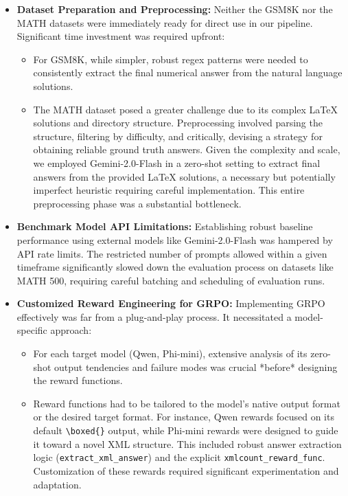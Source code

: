 \documentclass[11pt]{article}
\begin{document}
\begin{itemize}
\begin{itemize}
    \item \textbf{Dataset Preparation and Preprocessing:} Neither the GSM8K nor the MATH datasets were immediately ready for direct use in our pipeline. Significant time investment was required upfront:
        \begin{itemize}
            \item For GSM8K, while simpler, robust regex patterns were needed to consistently extract the final numerical answer from the natural language solutions.
            \item The MATH dataset posed a greater challenge due to its complex LaTeX solutions and directory structure. Preprocessing involved parsing the structure, filtering by difficulty, and critically, devising a strategy for obtaining reliable ground truth answers. Given the complexity and scale, we employed Gemini-2.0-Flash in a zero-shot setting to extract final answers from the provided LaTeX solutions, a necessary but potentially imperfect heuristic requiring careful implementation. This entire preprocessing phase was a substantial bottleneck.
        \end{itemize}

    \item \textbf{Benchmark Model API Limitations:} Establishing robust baseline performance using external models like Gemini-2.0-Flash was hampered by API rate limits. The restricted number of prompts allowed within a given timeframe significantly slowed down the evaluation process on datasets like MATH 500, requiring careful batching and scheduling of evaluation runs.

    \item \textbf{Customized Reward Engineering for GRPO:} Implementing GRPO effectively was far from a plug-and-play process. It necessitated a model-specific approach:
        \begin{itemize}
            \item For each target model (Qwen, Phi-mini), extensive analysis of its zero-shot output tendencies and failure modes was crucial *before* designing the reward functions.
            \item Reward functions had to be tailored to the model's native output format or the desired target format. For instance, Qwen rewards focused on its default \texttt{\textbackslash boxed\{\}} output, while Phi-mini rewards were designed to guide it toward a novel XML structure. This included robust answer extraction logic (\texttt{extract\_xml\_answer}) and the explicit \texttt{xmlcount\_reward\_func}. Customization of these rewards required significant experimentation and adaptation.


\end{itemize}
\end{itemize}
\end{itemize}
\end{document}
